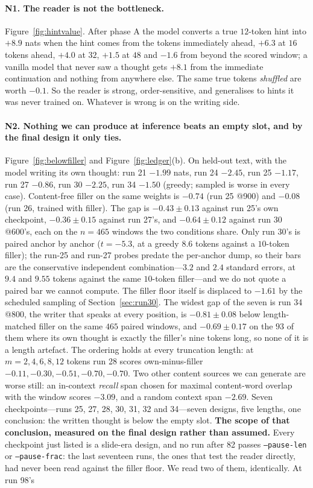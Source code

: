 \documentclass{article} %
\begin{document}
\paragraph{N1. The reader is not the bottleneck.} Figure~\ref{fig:hintvalue}. After phase A the model converts a true $12$-token hint into $+8.9$ nats when the hint comes from the tokens immediately ahead, $+6.3$ at $16$ tokens ahead, $+4.0$ at $32$, $+1.5$ at $48$ and $-1.6$ from beyond the scored window; a vanilla model that never saw a thought gets $+8.1$ from the immediate continuation and nothing from anywhere else. The same true tokens \emph{shuffled} are worth $-0.1$. So the reader is strong, order-sensitive, and generalises to hints it was never trained on. Whatever is wrong is on the writing side.

\paragraph{N2. Nothing we can produce at inference beats an empty slot, and by the final design it only ties.} Figure~\ref{fig:belowfiller} and Figure~\ref{fig:ledger}(b). On held-out text, with the model writing its own thought: run 21 $-1.99$ nats, run 24 $-2.45$, run 25 $-1.17$, run 27 $-0.86$, run 30 $-2.25$, run 34 $-1.50$ (greedy; sampled is worse in every case). Content-free filler on the same weights is $-0.74$ (run 25 @900) and $-0.08$ (run 26, trained with filler). The gap is $-0.43 \pm 0.13$ against run 25's own checkpoint, $-0.36 \pm 0.15$ against run 27's, and $-0.64 \pm 0.12$ against run 30 @600's, each on the $n=465$ windows the two conditions share. Only run 30's is paired anchor by anchor ($t=-5.3$, at a greedy $8.6$ tokens against a $10$-token filler); the run-25 and run-27 probes predate the per-anchor dump, so their bars are the conservative independent combination---$3.2$ and $2.4$ standard errors, at $9.4$ and $9.55$ tokens against the same $10$-token filler---and we do not quote a paired bar we cannot compute. The filler floor itself is displaced to $-1.61$ by the scheduled sampling of Section~\ref{sec:run30}. The widest gap of the seven is run 34 @800, the writer that speaks at every position, is $-0.81 \pm 0.08$ below length-matched filler on the same $465$ paired windows, and $-0.69 \pm 0.17$ on the $93$ of them where its own thought is exactly the filler's nine tokens long, so none of it is a length artefact. The ordering holds at every truncation length: at $m=2,4,6,8,12$ tokens run 28 scores own-minus-filler $-0.11, -0.30, -0.51, -0.70, -0.70$. Two other content sources we can generate are worse still: an in-context \emph{recall} span chosen for maximal content-word overlap with the window scores $-3.09$, and a random context span $-2.69$. Seven checkpoints---runs 25, 27, 28, 30, 31, 32 and 34---seven designs, five lengths, one conclusion: the written thought is below the empty slot. \textbf{The scope of that conclusion, measured on the final design rather than assumed.} Every checkpoint just listed is a slide-era design, and no run after 82 passes \texttt{--pause-len} or \texttt{--pause-frac}: the last seventeen runs, the ones that test the reader directly, had never been read against the filler floor. We read two of them, identically. At run 98's 
\end{document}
